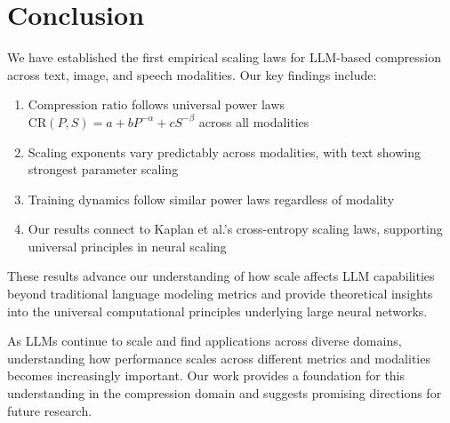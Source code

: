 \documentclass[11pt]{article}
\begin{document}
\section{Conclusion}

We have established the first empirical scaling laws for LLM-based compression across text, image, and speech modalities. Our key findings include:

\begin{enumerate}
\item Compression ratio follows universal power laws $\mathrm{CR}(P,S) = a + bP^{-\alpha} + cS^{-\beta}$ across all modalities
\item Scaling exponents vary predictably across modalities, with text showing strongest parameter scaling
\item Training dynamics follow similar power laws regardless of modality
\item Our results connect to Kaplan et al.'s cross-entropy scaling laws, supporting universal principles in neural scaling
\end{enumerate}

These results advance our understanding of how scale affects LLM capabilities beyond traditional language modeling metrics and provide theoretical insights into the universal computational principles underlying large neural networks.

As LLMs continue to scale and find applications across diverse domains, understanding how performance scales across different metrics and modalities becomes increasingly important. Our work provides a foundation for this understanding in the compression domain and suggests promising directions for future research.

\newpage
\end{document}
